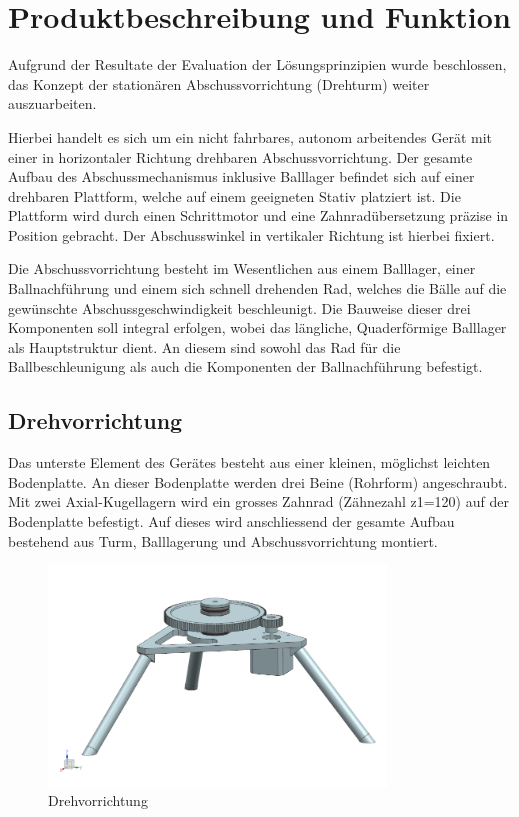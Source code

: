 \section{Produktbeschreibung und Funktion}

Aufgrund der Resultate der Evaluation der Lösungsprinzipien wurde beschlossen, 
das Konzept der stationären Abschussvorrichtung (Drehturm) weiter 
auszuarbeiten. 

Hierbei handelt es sich um ein nicht fahrbares, autonom arbeitendes Gerät mit 
einer in horizontaler Richtung drehbaren Abschussvorrichtung. Der gesamte Aufbau 
des Abschussmechanismus inklusive Balllager befindet sich auf einer drehbaren 
Plattform, welche auf einem geeigneten Stativ platziert ist. Die Plattform 
wird durch einen Schrittmotor und eine Zahnradübersetzung präzise in Position 
gebracht. Der Abschusswinkel in vertikaler Richtung ist hierbei fixiert. 

Die Abschussvorrichtung besteht im Wesentlichen aus einem Balllager, einer 
Ballnachführung und einem sich schnell drehenden Rad, welches die Bälle auf 
die gewünschte Abschussgeschwindigkeit beschleunigt. Die Bauweise dieser drei 
Komponenten soll integral erfolgen, wobei das längliche, Quaderförmige 
Balllager als Hauptstruktur dient. An diesem sind sowohl das Rad für die 
Ballbeschleunigung als auch die Komponenten der Ballnachführung befestigt.

\subsection{Drehvorrichtung}
Das unterste Element des Gerätes besteht aus einer kleinen, möglichst leichten 
Bodenplatte. An dieser Bodenplatte werden drei Beine (Rohrform) angeschraubt. Mit 
zwei Axial-Kugellagern wird ein grosses Zahnrad (Zähnezahl z1=120) auf der Bodenplatte 
befestigt. Auf dieses wird anschliessend der gesamte Aufbau bestehend aus Turm, Balllagerung und Abschussvorrichtung montiert. 

\begin{figure}[h!]          
	\centering             
	\includegraphics[width=0.8\textwidth]{fig/Bild_Drehturm.png}    
	\caption{Drehvorrichtung}
	
	\label{fig:bild}        %
\end{figure}

